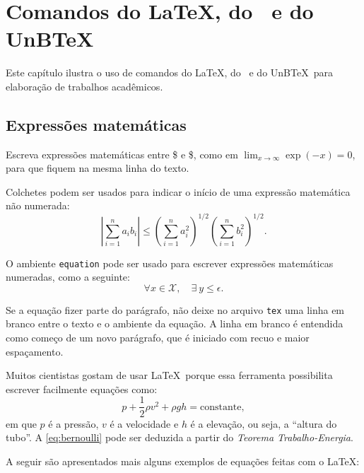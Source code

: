 \chapter{Comandos do \LaTeX, do \abnTeX\ e do UnB\TeX}
\label{cap:exemplos}

Este capítulo ilustra o uso de comandos do \LaTeX, do \abnTeX\ e do UnB\TeX\ para elaboração de trabalhos acadêmicos.

\section{Expressões matemáticas}
\label{sec:mat}

Escreva expressões matemáticas entre \$ e \$, como em $\lim_{x \to \infty}\exp(-x) = 0$, para que fiquem na mesma linha do texto.

Colchetes podem ser usados para indicar o início de uma expressão matemática não numerada:
\[
\left|\sum_{i=1}^n a_ib_i\right|
\le
\left(\sum_{i=1}^n a_i^2\right)^{1/2}
\left(\sum_{i=1}^n b_i^2\right)^{1/2}.
\]

O ambiente \texttt{equation} pode ser usado para escrever expressões matemáticas numeradas, como a seguinte:
\begin{equation}
  \forall x \in \mathcal{X}, \quad \exists \: y \leq \epsilon.
\end{equation}

Se a equação fizer parte do parágrafo, não deixe no arquivo \texttt{tex} uma linha em branco entre o texto e o ambiente da equação. A linha em branco é entendida como começo de um novo parágrafo, que é iniciado com recuo e maior espaçamento.

Muitos cientistas gostam de usar \LaTeX\ porque essa ferramenta possibilita escrever facilmente equações como:
\begin{equation}
p+\frac{1}{2}{\rho}v^2+{\rho}gh = \mathrm{constante},
\label{eq:bernoulli}
\end{equation}
em que $p$ é a pressão, $v$ é a velocidade e $h$ é a elevação, ou seja, a ``altura do tubo''. A \cref{eq:bernoulli} pode ser deduzida a partir do \textit{Teorema Trabalho-Energia}.


A seguir são apresentados mais alguns exemplos de equações feitas com o \LaTeX:

